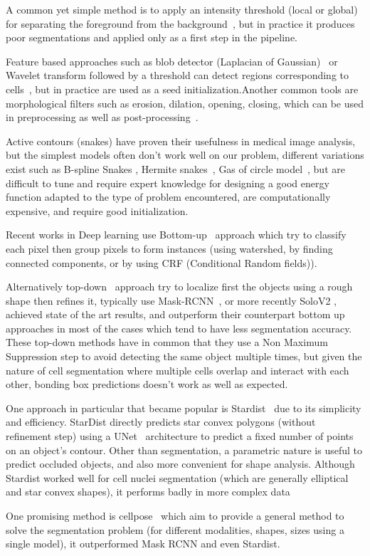 \documentclass[main.tex]{subfiles}
\begin{document}
A common yet simple method is to apply an intensity threshold (local or global) for separating the foreground from the background~\cite{Meijering2012}, but in practice it produces poor segmentations and applied only as a first step in the pipeline.\par
Feature based approaches  such as blob detector (Laplacian of Gaussian)~\cite{Hafiz2020} or Wavelet transform  followed by a threshold can detect regions corresponding to cells~\cite{Boquet-Pujadas2021}, but in practice are used as a seed initialization.Another common tools are morphological filters such as erosion, dilation, opening, closing, which can be used in preprocessing as well as post-processing~\cite{Meijering2012}.\par
Active contours (snakes) have proven their usefulness in medical image analysis\cite{Boquet-Pujadas2021}, but the simplest models often don't work well on our problem, different variations exist such as B-spline Snakes \cite{Brigger2000}, Hermite snakes~\cite{Uhlmann2016}, Gas of circle model~\cite{Molnar2016}, but are difficult to tune and require expert knowledge for designing a good energy function adapted to the type of problem encountered, are computationally expensive, and require good initialization.\par
Recent works in Deep learning use Bottom-up~\cite{Hafiz2020} approach which try to classify each pixel then group pixels to form instances (using watershed, by finding connected components, or by using CRF (Conditional Random fields)\cite{Arnab2018}).\par
Alternatively top-down~\cite{Hafiz2020} approach try to localize first the objects using a rough shape then refines it, typically use Mask-RCNN~\cite{Hafiz2020, he2017mask, johnson2018adapting}, or more recently SoloV2 \cite{Wang2020}, achieved state of the art results, and outperform their counterpart bottom up approaches in most of the cases which tend to have less segmentation accuracy. These top-down methods have in common that they use a Non Maximum Suppression step to avoid detecting the same object multiple times, but given the nature of cell segmentation where multiple cells overlap and interact with each other, bonding box predictions doesn't work as well as expected.\par
One approach in particular that became popular is Stardist~\cite{Schmidt2018} due to its simplicity and efficiency. StarDist directly predicts star convex polygons (without refinement step) using a UNet~\cite{Ronneberger2015} architecture to predict a fixed number of points on an object's contour. Other than segmentation, a parametric nature is useful to predict occluded objects, and also more convenient for shape analysis. Although Stardist worked well for cell nuclei segmentation (which are generally elliptical and star convex shapes), it performs badly in more complex data\par
One promising method is cellpose~\cite{Stringer2020} which aim to provide a general method to solve the segmentation problem (for different modalities, shapes, sizes using a single model), it outperformed Mask RCNN and even Stardist.\\
\end{document}
